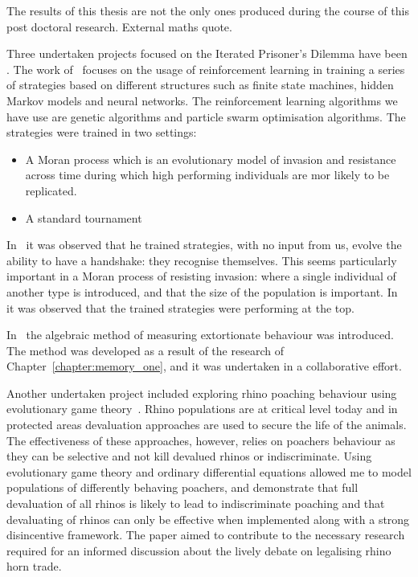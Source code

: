 The results of this thesis are not the only ones produced during the course of
this post doctoral research. External maths quote.

Three undertaken projects focused on the Iterated Prisoner's Dilemma have been
\cite{Knight2019, Knight2017, Harper2017}. The work of~\cite{Knight2017, Harper2017}
focuses on the usage of reinforcement learning in training a series of
strategies based on different structures such as finite state machines, hidden
Markov models and neural networks. The reinforcement learning algorithms we have
use are genetic algorithms and particle swarm optimisation algorithms. The
strategies were trained in two settings:

\begin{itemize}
    \item A Moran process which is an evolutionary model of invasion and
    resistance across time during which high performing individuals are mor
    likely to be replicated.
    \item A standard tournament
\end{itemize}

In~\cite{Harper2017} it was observed that he trained strategies, with no input
from us, evolve the ability to have a handshake: they recognise themselves. This
seems particularly important in a Moran process of resisting invasion: where a
single individual of another type is introduced, and that the size of the
population is important. In~\cite{Knight2017} it was observed that the trained
strategies were performing at the top.

In~\cite{Knight2019} the algebraic method of measuring extortionate behaviour
was introduced. The method was developed as a result of the research of
Chapter~\ref{chapter:memory_one}, and it was undertaken in a collaborative
effort.

Another undertaken project included exploring rhino poaching behaviour using
evolutionary game theory~\cite{Glynatsi2018}. Rhino populations are at critical
level today and in protected areas devaluation approaches are used to secure the
life of the animals. The effectiveness of these approaches, however, relies on
poachers behaviour as they can be selective and not kill devalued rhinos or
indiscriminate. Using evolutionary game theory and ordinary differential
equations allowed me to model populations of differently behaving poachers, and
demonstrate that full devaluation of all rhinos is likely to lead to
indiscriminate poaching and that devaluating of rhinos can only be effective
when implemented along with a strong disincentive framework. The paper aimed to
contribute to the necessary research required for an informed discussion about
the lively debate on legalising rhino horn trade.

